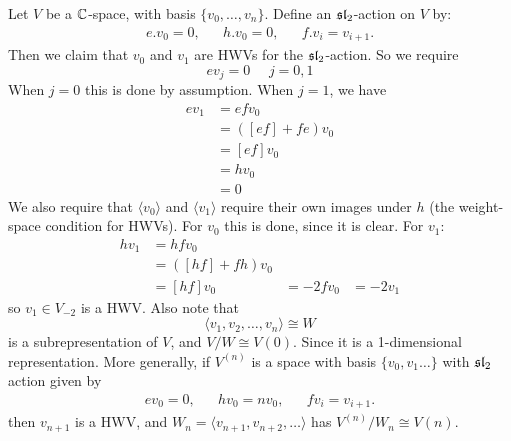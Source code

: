 \documentclass{article}
\begin{document}
\endproof
\begin{ex*}
    Let $V$ be a $\mathbb{C}$-space, with basis $\{v_{0}, \dots, v_{n}\}$. Define an $\mathfrak{sl}_{2}$-action on $V$ by: \begin{align*}
        e.v_{0}=0, & & h.v_{0} = 0, & & f.v_{i}=v_{i+1}.
    \end{align*}
    Then we claim that $v_{0}$ and $v_{1}$ are HWVs for the $\mathfrak{sl}_{2}$-action. So we require \[ ev_{j} = 0 \,\,\,\,\,\, \, \, j=0,1\]
    When $j=0$ this is done by assumption. \gap When $j=1$, we have \begin{align*}
        ev_{1} &= efv_{0}\\
               &= ([ef] +fe)v_{0}\\
               &= [ef]v_{0}\\
               &= hv_{0}\\
               &=0
    \end{align*}
    We also require that $\langle v_{0} \rangle$ and $\langle v_{1} \rangle$ require their own images under $h$ (the weight-space condition for HWVs). \gap 
    For $v_{0}$ this is done, since it is clear. \gap 
    For $v_{1}$: \begin{align*}
        hv_{1} &= hfv_{0}\\
               &= ([hf] +fh)v_{0}\\
               &= [hf]v_{0}
               &= -2fv_{0}
               &= -2v_{1}
    \end{align*}
    so $v_{1} \in V_{-2}$ is a HWV.
    Also note that \[ \langle v_{1},v_{2}, \dots, v_{n} \rangle \cong W\] is a subrepresentation of $V$, and $V/W \cong V(0)$. Since it is a 1-dimensional representation. More generally, if $V^{(n)}$ is a space with basis $\{v_{0}, v_{1}\dots\}$ with $\mathfrak{sl}_{2}$ action given by \begin{align*}
        ev_{0}=0, & & hv_{0} = nv_{0}, & & fv_{i}=v_{i+1}.
    \end{align*}
    then $v_{n+1}$ is a HWV, and $W_{n} = \langle v_{n+1}, v_{n+2}, \dots \rangle$ has $V^{(n)}/W_{n} \cong V(n)$.
\end{ex*}
\end{document}
